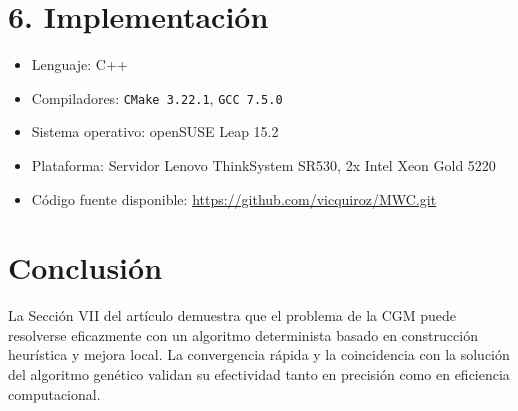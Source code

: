 \documentclass[12pt]{article}
\begin{document}
\section*{6. Implementación}

\begin{itemize}
    \item Lenguaje: C++
    \item Compiladores: \texttt{CMake 3.22.1}, \texttt{GCC 7.5.0}
    \item Sistema operativo: openSUSE Leap 15.2
    \item Plataforma: Servidor Lenovo ThinkSystem SR530, 2x Intel Xeon Gold 5220
    \item Código fuente disponible: \url{https://github.com/vicquiroz/MWC.git}
\end{itemize}

\section*{Conclusión}

La Sección VII del artículo demuestra que el problema de la CGM puede resolverse eficazmente con un algoritmo determinista basado en construcción heurística y mejora local. La convergencia rápida y la coincidencia con la solución del algoritmo genético validan su efectividad tanto en precisión como en eficiencia computacional.
\end{document}
